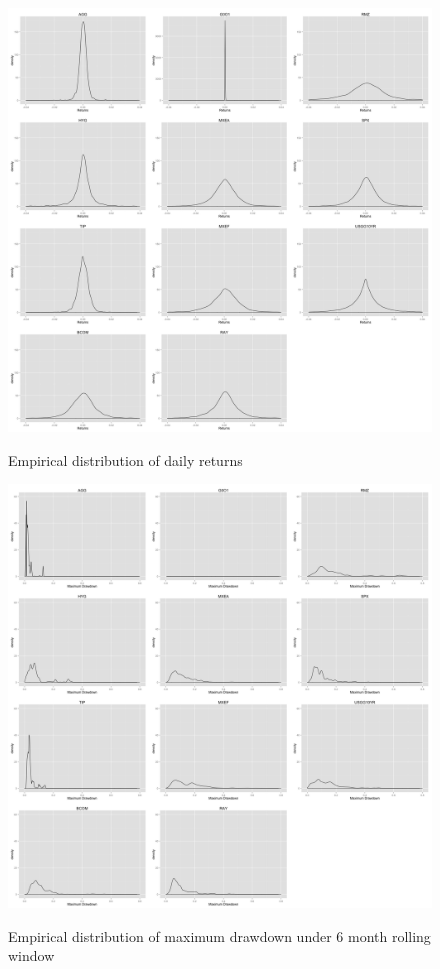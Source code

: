 \documentclass[12pt]{article}
\begin{document}
\begin{figure}[h]
\caption{Empirical distribution of daily returns} 
\centering 
\includegraphics[width=15cm]{../results/returns_dist}
\label{fig: returnsDist}
\end{figure}

\begin{figure}[h]
\caption{Empirical distribution of maximum drawdown under 6 month rolling window} 
\centering
\includegraphics[width=15cm]{../results/maxdd_dist_mon6}
\label{fig: dist_mdd}
\end{figure}
\end{document}
